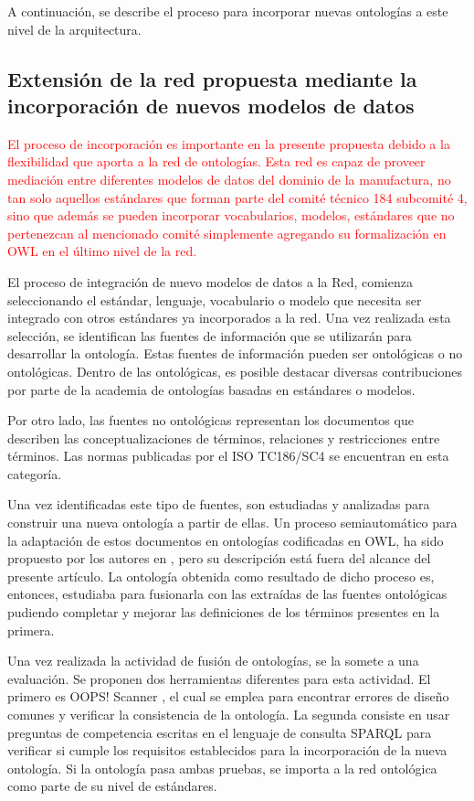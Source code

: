 \documentclass[journal]{IEEEtran}
\begin{document}
A continuaci\'on, se describe el proceso para incorporar nuevas ontolog\'ias a este nivel de la arquitectura. 

\subsection{Extensi\'on de la red propuesta mediante la incorporaci\'on de nuevos modelos de datos}

\textcolor{red}{El proceso de incorporaci\'on es importante en la presente propuesta debido a la flexibilidad que aporta a la red de ontolog\'ias. Esta red es capaz de proveer mediaci\'on entre diferentes modelos de datos del dominio de la manufactura, no tan solo aquellos est\'andares que forman parte del comit\'e t\'ecnico 184 subcomit\'e 4, sino que adem\'as se pueden incorporar vocabularios, modelos, est\'andares que no pertenezcan al mencionado comit\'e simplemente agregando su formalizaci\'on en OWL en el \'ultimo nivel de la red. }


El proceso de integraci\'on de nuevo modelos de datos a la Red, comienza seleccionando el est\'andar, lenguaje, vocabulario o modelo que necesita ser integrado con otros est\'andares ya incorporados a la red. Una vez realizada esta selecci\'on, se identifican las fuentes de informaci\'on que se utilizar\'an para desarrollar la ontolog\'ia. Estas fuentes de informaci\'on pueden ser ontol\'ogicas o no ontol\'ogicas. Dentro de las ontol\'ogicas, es posible destacar diversas contribuciones por parte de la academia de ontolog\'ias basadas en est\'andares o modelos.

Por otro lado, las fuentes no ontol\'ogicas representan los documentos que describen las conceptualizaciones de t\'erminos, relaciones y restricciones entre t\'erminos. Las normas publicadas por el ISO TC186/SC4 se encuentran en esta categor\'ia. 

Una vez identificadas este tipo de fuentes, son estudiadas y analizadas para construir una nueva ontolog\'ia a partir de ellas. Un proceso semiautom\'atico para la adaptaci\'on de estos documentos en ontolog\'ias codificadas en OWL, ha sido propuesto por los autores en \cite{Fraga2017}, pero su descripci\'on est\'a fuera del alcance del presente art\'iculo. La ontolog\'ia obtenida como resultado de dicho proceso es, entonces, estudiaba para fusionarla con las extra\'idas de las fuentes ontol\'ogicas pudiendo completar y mejorar las definiciones de los t\'erminos presentes en la primera.

Una vez realizada la actividad de fusi\'on de ontolog\'ias, se la somete a una evaluaci\'on. Se proponen dos herramientas diferentes para esta actividad. El primero es OOPS! Scanner \cite{Poveda-Villalon2009a}, el cual se emplea para encontrar errores de diseño comunes y verificar la consistencia de la ontolog\'ia. La segunda consiste en usar preguntas de competencia escritas en el lenguaje de consulta SPARQL para verificar si cumple los requisitos establecidos para la incorporaci\'on de la nueva ontolog\'ia. Si la ontolog\'ia pasa ambas pruebas, se importa a la red ontol\'ogica como parte de su nivel de est\'andares.
\end{document}
